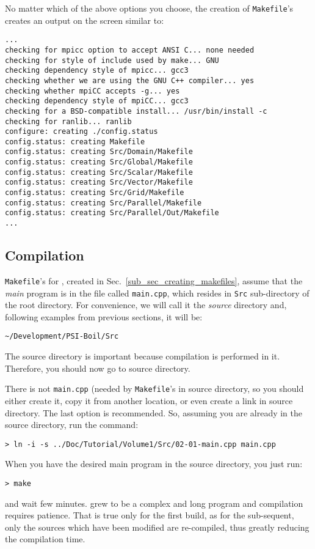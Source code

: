 No matter which of the above options you choose, the creation of {\tt Makefile}'s 
creates an output on the screen similar to:
%
{\small \begin{verbatim}
...
checking for mpicc option to accept ANSI C... none needed
checking for style of include used by make... GNU
checking dependency style of mpicc... gcc3
checking whether we are using the GNU C++ compiler... yes
checking whether mpiCC accepts -g... yes
checking dependency style of mpiCC... gcc3
checking for a BSD-compatible install... /usr/bin/install -c
checking for ranlib... ranlib
configure: creating ./config.status
config.status: creating Makefile
config.status: creating Src/Domain/Makefile
config.status: creating Src/Global/Makefile
config.status: creating Src/Scalar/Makefile
config.status: creating Src/Vector/Makefile
config.status: creating Src/Grid/Makefile
config.status: creating Src/Parallel/Makefile
config.status: creating Src/Parallel/Out/Makefile
...
\end{verbatim}}

\subsection{Compilation}

{\tt Makefile}'s for {\psiboil}, created in Sec.~\ref{sub_sec_creating_makefiles}, 
assume that the {\em main} program is in the file called {\tt main.cpp}, which resides 
in {\tt Src} sub-directory of the root directory. For convenience, we will call
it the {\em source} directory and, following examples from previous sections, it will 
be:
%
\begin{verbatim}
~/Development/PSI-Boil/Src
\end{verbatim}
%
The source directory is important because compilation is performed in it. Therefore,
you should now go to source directory. 

There is not {\tt main.cpp} (needed by {\tt Makefile}'s in source directory, so you 
should either create it, copy it from another location, or even create a link in source 
directory. The last option is recommended. So, assuming you are already in the source
directory, run the command:
%
\begin{verbatim}
> ln -i -s ../Doc/Tutorial/Volume1/Src/02-01-main.cpp main.cpp
\end{verbatim} 
%
When you have the desired main program in the source directory, you just run:
%
\begin{verbatim}
> make
\end{verbatim} 
%
and wait few minutes. {\psiboil} grew to be a complex and long program and
compilation requires patience. That is true only for the first build, as for
the sub-sequent, only the sources which have been modified are re-compiled,
thus greatly reducing the compilation time.

